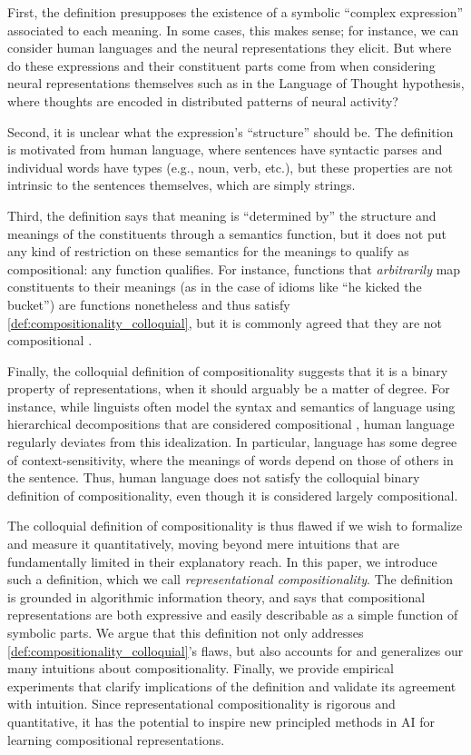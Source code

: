 \documentclass{article} %
\newcommand{\comp}{representational compositionality}
\begin{document}
First, the definition presupposes the existence of a symbolic ``complex expression'' associated to each meaning. In some cases, this makes sense; for instance, we can consider human languages and the neural representations they elicit. But where do these expressions and their constituent parts come from when considering neural representations themselves such as in the Language of Thought hypothesis, where thoughts are encoded in distributed patterns of neural activity?

Second, it is unclear what the expression's ``structure'' should be. The definition is motivated from human language, where sentences have syntactic parses and individual words have types (e.g., noun, verb, etc.), but these properties are not intrinsic to the sentences themselves, which are simply strings.

Third, the definition says that meaning is ``determined by'' the structure and meanings of the constituents through a semantics function, but it does not put any kind of restriction on these semantics for the meanings to qualify as compositional: any function qualifies. For instance, functions that \emph{arbitrarily} map constituents to their meanings (as in the case of idioms like ``he kicked the bucket'') are functions nonetheless and thus satisfy \cref{def:compositionality_colloquial}, but it is commonly agreed that they are not compositional \citep{weinreich1969problems,mabruroh2015analysis,swinney1979access}.

Finally, the colloquial definition of compositionality suggests that it is a binary property of representations, when it should arguably be a matter of degree. For instance, while linguists often model the syntax and semantics of language using hierarchical decompositions that are considered compositional \citep{chomsky1956three}, human language regularly deviates from this idealization. In particular, language has some degree of context-sensitivity, where the meanings of words depend on those of others in the sentence. Thus, human language does not satisfy the colloquial binary definition of compositionality, even though it is considered largely compositional.

The colloquial definition of compositionality is thus flawed if we wish to formalize and measure it quantitatively, moving beyond mere intuitions that are fundamentally limited in their explanatory reach. In this paper, we introduce such a definition, which we call \textit{\comp{}}. The definition is grounded in algorithmic information theory, and says that compositional representations are both expressive and easily describable as a simple function of symbolic parts. We argue that this definition not only addresses \cref{def:compositionality_colloquial}'s flaws, but also accounts for and generalizes our many intuitions about compositionality. Finally, we provide empirical experiments that clarify implications of the definition and validate its agreement with intuition. Since \comp{} is rigorous and quantitative, it has the potential to inspire new principled methods in AI for learning compositional representations.
\end{document}
